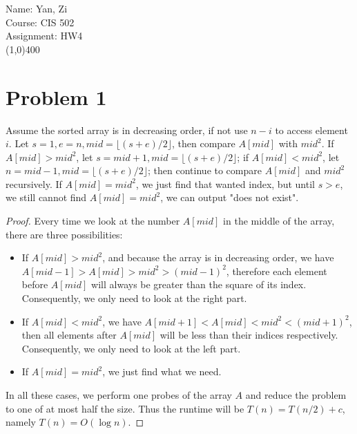 \documentclass[letter,12pt]{article}
\begin{document}
Name: Yan, Zi \\
Course: CIS 502 \\
Assignment: HW4 \\
\line(1,0){400}

\section*{Problem 1}
Assume the sorted array is in decreasing order, if not use $n-i$ to access
element $i$. Let $s = 1, e = n, 
mid=\lfloor (s+e)/2 \rfloor$, then compare $A[mid]$ with $mid^2$.
If $A[mid] > mid^2$, let $s = mid +1, mid = \lfloor (s+e)/2 \rfloor$;
if $A[mid] < mid^2$, let $n = mid - 1, mid = \lfloor (s+e)/2 \rfloor$;
then continue to compare $A[mid]$ and $mid^2$ recursively.
If $A[mid] = mid^2$, we just find that wanted index, but until $s > e$,
we still cannot find $A[mid] = mid^2$, we can output "does not exist".

\begin{proof}
Every time we look at the number $A[mid]$ in the middle of the array,
there are three possibilities:
\begin{itemize}
    \item If $A[mid] > mid^2$, and because the array is in decreasing
    order, we have $A[mid-1] > A[mid] > mid^2 > (mid-1)^2$, therefore
    each element before $A[mid]$ will always be greater than the square of
    its index. Consequently, we only need to look at the right part.
    \item If $A[mid] < mid ^2$, we have $A[mid+1]<A[mid]<mid^2<
    (mid+1)^2$, then all elements after $A[mid]$ will be less than their
    indices respectively. Consequently, we only need to look at the left part.
    \item If $A[mid] = mid^2$, we just find what we need.
\end{itemize}
In all these cases, we perform one probes of the array $A$ and reduce
the problem to one of at most half the size. Thus the runtime will be
$T(n) = T(n/2) + c$, namely $T(n) = O(\log n)$.
\end{proof}
\end{document}
